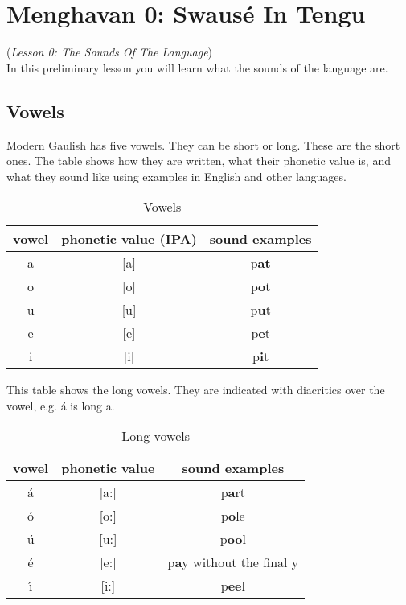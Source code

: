 \section{Menghavan 0: Swaus\'{e} In Tengu}
(\textit{Lesson 0: The Sounds Of The Language})\\

\noindent In this preliminary lesson you will learn what the sounds of the language are.

\subsection{Vowels}
\noindent Modern Gaulish has five vowels. They can be short or long. These are the short ones. The table shows how they are written, what their phonetic value is, and what they sound like using examples in English and other languages.

\begin{table}[H]
\begin{center}
\begin{tabu}{c|c|c}
  \textbf{vowel} & \textbf{phonetic value (IPA)} & \textbf{sound examples}\\
  \toprule
  a & [a] & p\textbf{at}\\
  o & [o] & p\textbf{o}t\\
  u & [u] & p\textbf{u}t\\
  e & [e] & p\textbf{e}t\\
  i & [i] & p\textbf{i}t\\
\end{tabu}
\end{center}
\caption{Vowels}
\label{phonology_vowels}
\end{table}

\noindent This table shows the long vowels. They are indicated with diacritics over the vowel, e.g. \'{a} is long a.

\begin{table}[H]
\begin{center}
\begin{tabu}{c|c|c}
  \textbf{vowel} & \textbf{phonetic value} & \textbf{sound examples}\\
  \toprule
  \'{a} & [a:] & p\textbf{a}rt\\
  \'{o} & [o:] & p\textbf{o}le\\
  \'{u} & [u:] & p\textbf{oo}l\\
  \'{e} & [e:] & p\textbf{a}y without the final y\\
  \'{\i} & [i:] & p\textbf{ee}l\\
\end{tabu}
\end{center}
\caption{Long vowels}
\label{phonology_long_vowels}
\end{table}

